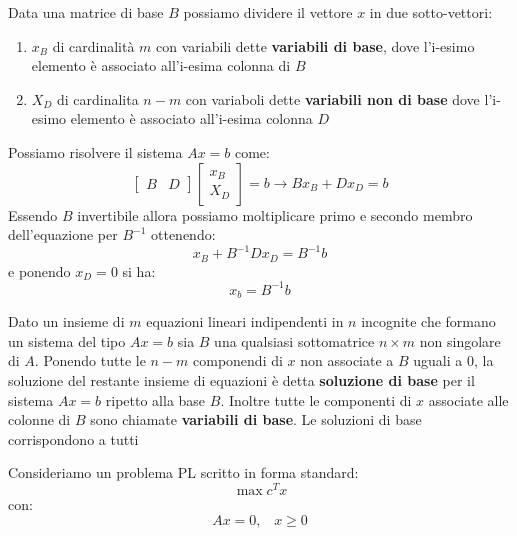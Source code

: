 \message{ !name(ro.tex)}\documentclass[a4paper,12pt, oneside]{book}
\begin{document}
Data una matrice di base $B$ possiamo dividere il vettore $x$ in due
sotto-vettori:
\begin{enumerate}
  \item $x_B$ di cardinalità $m$ con variabili dette \textbf{variabili
    di base}, dove l'i-esimo  elemento è associato all'i-esima colonna di $B$
  \item $X_D$ di cardinalita $n-m$ con variaboli dette
  \textbf{variabili non di base} dove l'i-esimo elemento è associato
  all'i-esima colonna $D$
\end{enumerate}
Possiamo risolvere il sistema $Ax=b$ come:
\[
  \left[
    \begin{matrix}
      B & D
    \end{matrix}
  \right]\left[
    \begin{matrix}
      x_B\\
      X_D
    \end{matrix}
  \right]=b\longrightarrow Bx_B+Dx_D=b
\]
Essendo $B$ invertibile allora possiamo moltiplicare primo e secondo
membro dell'equazione per $B^{-1}$ ottenendo:
\[x_B+B^{-1}Dx_D=B^{-1}b\]
e ponendo $x_D=0$ si ha:
\[x_b=B^{-1}b\]
\begin{definizione}
  Dato un insieme di $m$ equazioni lineari indipendenti in $n$
  incognite che formano un sistema del tipo $Ax=b$ sia $B$ una
  qualsiasi sottomatrice $n\times m$ non singolare di $A$. Ponendo
  tutte le $n-m$ componendi di $x$ non associate a $B$ uguali a 0, la
  soluzione del restante insieme di equazioni è detta
  \textbf{soluzione di base} per il sistema $Ax=b$ ripetto alla base
  $B$. Inoltre tutte le componenti di $x$ associate alle colonne di
  $B$ sono chiamate \textbf{variabili di base}. Le soluzioni di base
  corrispondono a tutti 
\end{definizione}
Consideriamo un problema PL scritto in forma standard:
\[\max c^Tx\]
con:
\[Ax=0,\,\,\,\,\,x\geq 0\]
\end{document}
